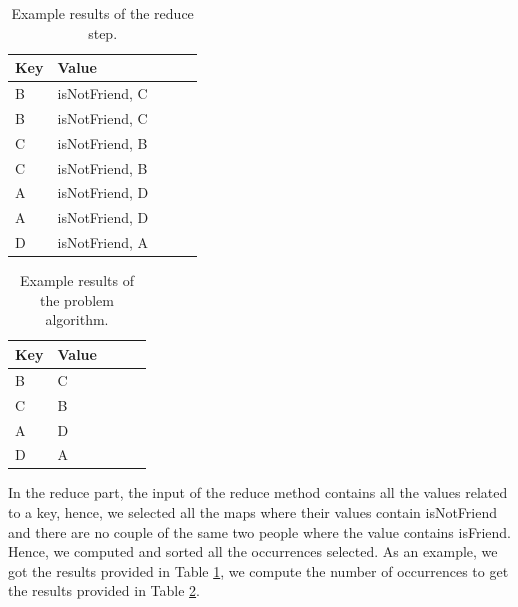 \documentclass[10pt, conference]{IEEEtran}
\begin{document}
\begin{center}
\begin{table}
\begin{center}
\begin{tabular}{|l|l|l|l|l|}
  \hline
  Key & Value \\
  \hline
 B & isNotFriend, C \\
 B & isNotFriend, C \\
 C & isNotFriend, B \\
  C & isNotFriend, B \\
 A & isNotFriend, D \\
 A & isNotFriend, D \\
  D & isNotFriend, A \\
  \hline
\end{tabular}
\caption{\label{ReduceExampleProblem} Example results of the reduce step.}
\end{center}
\end{table}
\end{center}

\begin{center}
\begin{table}
\begin{center}
\begin{tabular}{|l|l|l|l|l|}
  \hline
  Key & Value \\
  \hline
 B & C \\
 C &  B \\
 A &  D \\
  D & A \\
  \hline
\end{tabular}
\caption{\label{ReduceExampleResults} Example results of the problem algorithm.}
\end{center}
\end{table}
\end{center}

In the reduce part, the input of the reduce method contains all the values related to a key, hence, we selected all the maps where their values contain isNotFriend and there are no couple of the same two people where the value contains isFriend. Hence, we computed and sorted all the occurrences selected. As an example, we got the results provided in Table \ref{ReduceExampleProblem}, we compute the number of occurrences to get the results provided in Table \ref{ReduceExampleResults}.
\end{document}
